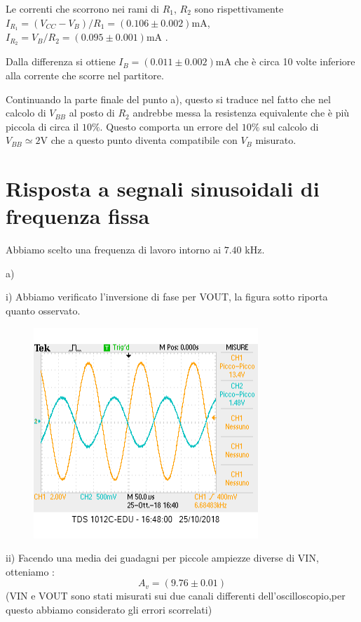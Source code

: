 \documentclass[10pt,a4paper]{article}
\begin{document}
Le correnti che scorrono nei rami di $R_1$, $R_2$ sono rispettivamente $I_{R_1} = (V_{CC}-V_{B})/R_1 = (0.106\pm 0.002)\si{\milli\ampere}  $, $I_{R_2} = V_{B}/R_2=(0.095\pm 0.001)\si{\milli\ampere} $ .

Dalla differenza si ottiene $I_B = (0.011\pm 0.002) \si{\milli\ampere} $ che è circa 10 volte inferiore alla corrente che scorre nel partitore.

Continuando la parte finale del punto a), questo si traduce nel fatto che nel calcolo di $V_{BB}$ al posto di $R_2 $ andrebbe messa la resistenza equivalente che è più piccola di circa il $10\%$. Questo comporta un errore del $10\% $ sul calcolo di $V_{BB}\simeq 2\si{\volt}$ che a questo punto diventa compatibile con $V_{B}$ misurato.



\section{Risposta a segnali sinusoidali di frequenza fissa}

Abbiamo scelto una frequenza di lavoro intorno ai $7.40$ \si{\kilo\hertz}.

a) 
\vspace{0.5cm}

i)  Abbiamo verificato l'inversione di fase per VOUT, la figura sotto riporta quanto osservato.

\begin{figure}[h]
	\centering
	\includegraphics[scale=0.5]{oscilloscopio.png}

	
	
\end{figure}

ii)  Facendo una media dei guadagni per piccole  ampiezze diverse di VIN, otteniamo :\[A_v= (9.76\pm0.01) \]
  (VIN e VOUT sono stati misurati sui due canali differenti dell'oscilloscopio,per questo abbiamo considerato gli errori scorrelati)
\end{document}
